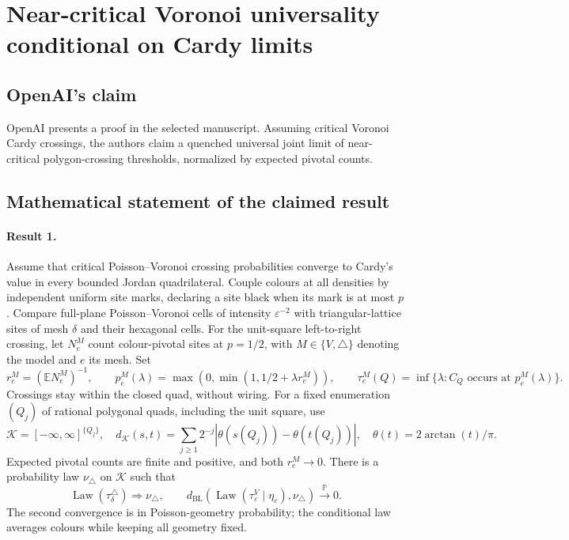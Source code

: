 \documentclass[11pt]{article}
\begin{document}
\section*{Near-critical Voronoi universality conditional on Cardy limits}

\subsection{OpenAI's claim}
OpenAI presents a proof in the selected manuscript. Assuming critical Voronoi Cardy crossings, the authors claim a quenched universal joint limit of near-critical polygon-crossing thresholds, normalized by expected pivotal counts.

\subsection{Mathematical statement of the claimed result}
\paragraph{Result 1.} Assume that critical Poisson--Voronoi crossing probabilities converge to Cardy's value in every bounded Jordan quadrilateral. Couple colours at all densities by independent uniform site marks, declaring a site black when its mark is at most $p$. Compare full-plane Poisson--Voronoi cells of intensity $\varepsilon^{-2}$ with triangular-lattice sites of mesh $\delta$ and their hexagonal cells. For the unit-square left-to-right crossing, let $N_e^M$ count colour-pivotal sites at $p=1/2$, with $M\in\{V,\triangle\}$ denoting the model and $e$ its mesh. Set
\[
 r_e^M=(\mathbb EN_e^M)^{-1},\qquad
 p_e^M(\lambda)=\max(0,\min(1,1/2+\lambda r_e^M)),\qquad
 \tau_e^M(Q)=\inf\{\lambda:C_Q\text{ occurs at }p_e^M(\lambda)\}.
\]
Crossings stay within the closed quad, without wiring. For a fixed enumeration $(Q_j)$ of rational polygonal quads, including the unit square, use
\[
 \mathcal K=[-\infty,\infty]^{\{Q_j\}},\quad
 d_{\mathcal K}(s,t)=\sum_{j\ge1}2^{-j}|\theta(s(Q_j))-\theta(t(Q_j))|,\quad
 \theta(t)=2\arctan(t)/\pi.
\]
Expected pivotal counts are finite and positive, and both $r_e^M\to0$. There is a probability law $\nu_{\triangle}$ on $\mathcal K$ such that
\[
 \operatorname{Law}(\tau_\delta^{\triangle})\Longrightarrow\nu_{\triangle},\qquad
 d_{\mathrm{BL}}(\operatorname{Law}(\tau_\varepsilon^V\mid\eta_\varepsilon),\nu_{\triangle})
 \xrightarrow{\mathbb P}0.
\]
The second convergence is in Poisson-geometry probability; the conditional law averages colours while keeping all geometry fixed.
\end{document}
